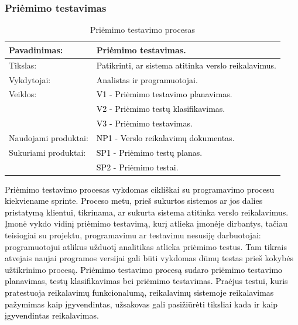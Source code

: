 \documentclass{VUMIFPSkursinis}
\begin{document}
	\subsubsection{Priėmimo testavimas}
	\begin{center}
		\begin{table}[ht]
			\caption{Priėmimo testavimo procesas}
			\begin{tabular}{ | l | l | }
				\hline
				Pavadinimas:         & Priėmimo testavimas.                                               \\ \hline
				Tikslas:             & \textcolor{black}{Patikrinti, ar sistema atitinka verslo reikalavimus.}   \\ \hline
				Vykdytojai:          & \textcolor{black}{Analistas ir programuotojai.}                           \\ \hline
				Veiklos:             & \textcolor{black}{V1 - Priėmimo testavimo planavimas.}                    \\
				                     & \textcolor{black}{V2 - Priėmimo testų klasifikavimas.}             \\
				                     & \textcolor{black}{V3 - Priėmimo testavimas.}                              \\ \hline
				Naudojami produktai: & \textcolor{black}{NP1 - Verslo reikalavimų dokumentas.}                   \\ \hline
				Sukuriami produktai: & \textcolor{black}{SP1 - Priėmimo testų planas.}                    \\
				                     & \textcolor{black}{SP2 - Priėmimo testai.}                          \\ \hline
			\end{tabular}
		\end{table}
	\end{center}
	\textcolor{black}{Priėmimo testavimo procesas vykdomas cikliškai su programavimo procesu kiekviename sprinte.
	Proceso metu, prieš sukurtos sistemos ar jos dalies pristatymą klientui, tikrinama, ar sukurta sistema atitinka verslo reikalavimus.}
	Įmonė vykdo vidinį priėmimo testavimą, kurį atlieka įmonėje dirbantys, tačiau teisiogiai su projektu, programavimu ar testavimu nesusiję darbuotojai: programuotojui atlikus užduotį analitikas atlieka priėmimo testus.
	Tam tikrais atvejais naujai programos versijai gali būti vykdomas dūmų testas prieš kokybės užtikrinimo procesą.
	\textcolor{black}{Priėmimo testavimo procesą sudaro priėmimo testavimo planavimas, testų klasifikavimas bei priėmimo testavimas.
	Praėjus testui, kuris pratestuoja reikalavimų funkcionalumą, reikalavimų sistemoje reikalavimas pažymimas kaip įgyvendintas, užsakovas gali pasižiūrėti tiksliai kada ir kaip įgyvendintas reikalavimas.}
\end{document}
